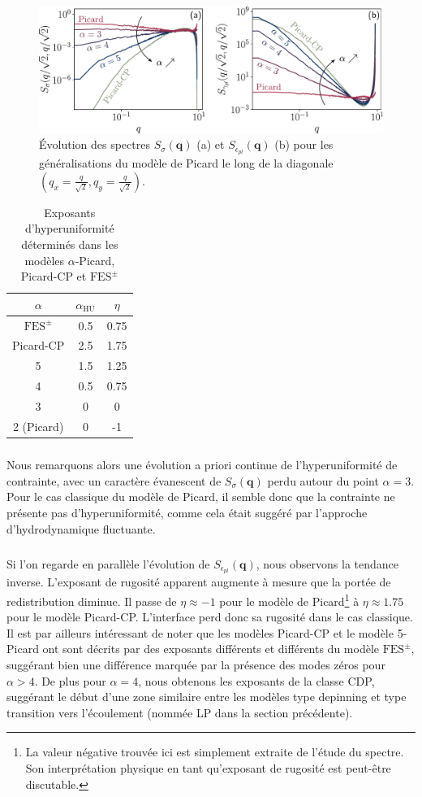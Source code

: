 \begin{figure}[h]
	\centering
	\includegraphics[width=\textwidth]{Chapitre4/Figures/Correlations/Evol_Sfact.pdf}
	\caption{Évolution des spectres $S_\sigma(\mathbf{q})$ (a) et $S_{\epsilon_{pl}}(\mathbf{q})$ (b) pour les généralisations du modèle de Picard le long de la diagonale $(q_x=\frac{q}{\sqrt{2}},q_y=\frac{q}{\sqrt{2}})$.}
	\label{fig:SfactAlphaPicard}
\end{figure}

\begin{table}[h]
\centering
\begin{tabular}{ccc}
\hline \hline $\alpha$ & $\alpha_\text{HU}$ & $\eta$ \\
\hline 
$\text{FES}^\pm$ & 0.5 & 0.75  \\
Picard-CP & 2.5 & 1.75  \\
5 & 1.5 & 1.25  \\
4 & 0.5 & 0.75  \\
3 & 0 & 0  \\
2 (Picard) & 0 & -1 \\
\hline \hline
\end{tabular}
\caption{Exposants d'hyperuniformité déterminés dans les modèles $\alpha$-Picard, Picard-CP et $\text{FES}^\pm$}
\label{tab:expoHU}
\end{table}

\subparagraph{}Nous remarquons alors une évolution a priori continue de l'hyperuniformité de contrainte, avec un caractère évanescent de $S_\sigma(\mathbf{q})$ perdu autour du point $\alpha=3$. Pour le cas classique du modèle de Picard, il semble donc que la contrainte ne présente pas d'hyperuniformité, comme cela était suggéré par l'approche d'hydrodynamique fluctuante.

\subparagraph{}Si l'on regarde en parallèle l'évolution de $S_{\epsilon_{pl}}(\mathbf{q})$, nous observons la tendance inverse. L'exposant de rugosité apparent augmente à mesure que la portée de redistribution diminue. Il passe de $\eta\approx -1$ pour le modèle de Picard\footnote{La valeur négative trouvée ici est simplement extraite de l'étude du spectre. Son interprétation physique en tant qu'exposant de rugosité est peut-être discutable.} à $\eta\approx 1.75$ pour le modèle Picard-CP. L'interface perd donc sa rugosité dans le cas classique. Il est par ailleurs intéressant de noter que les modèles Picard-CP et le modèle 5-Picard ont sont décrits par des exposants différents et différents du modèle $\text{FES}^\pm$, suggérant bien une différence marquée par la présence des modes zéros pour $\alpha>4$. De plus pour $\alpha=4$, nous obtenons les exposants de la classe CDP, suggérant le début d'une zone similaire entre les modèles type depinning et type transition vers l'écoulement (nommée LP dans la section précédente).

